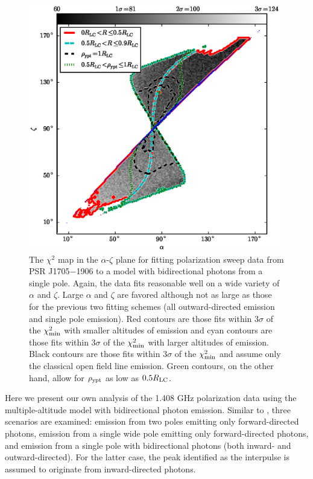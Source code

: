 \begin{figure}[t!!]
\begin{center}
\includegraphics[width=0.98\textwidth]{chapters/inwardDirectedPhotons/figures/mapB1702IPBackward.eps}
\caption[The $\chi^2$ map in the $\alpha$-$\zeta$ plane
for fitting polarization sweep data from PSR J1705$-$1906
to a model with bidirectional photons from a single pole]{
The $\chi^2$ map in the $\alpha$-$\zeta$ plane
for fitting polarization sweep data from PSR J1705$-$1906
to a model with bidirectional photons from a single pole.
Again, the data fits reasonable well on a wide variety of
$\alpha$ and $\zeta$. Large $\alpha$ and $\zeta$
are favored although not as large as those for the 
previous two fitting schemes (all outward-directed emission
and single pole emission).  Red contours are those fits within
$3\sigma$ of the $\chi^2_{\rm{min}}$
with smaller altitudes of emission and
cyan contours are those fits within
$3\sigma$ of the $\chi^2_{\rm{min}}$ with larger
altitudes of emission.
Black contours are those fits within
$3\sigma$ of the $\chi^2_{\rm{min}}$
and assume only the classical
open field line emission.
Green contours, on the other hand, allow for
$\rho_{\rm{ypt}}$ as low as $0.5R_{\rm{LC}}$.
\label{fig:inward}
}
\end{center}
\end{figure}

Here we present our own analysis of the 1.408 GHz polarization 
data \citep{gould1998multifrequency} using the multiple-altitude model
with bidirectional photon emission.
Similar to \cite{weltevrede2007main}, three scenarios are
examined: emission from two poles emitting only forward-directed
photons, emission from a single wide pole emitting only forward-directed
photons, and emission from a single pole with bidirectional photons (both inward-
and outward-directed).  For the latter case, the peak identified as the interpulse
is assumed to originate from inward-directed photons.

